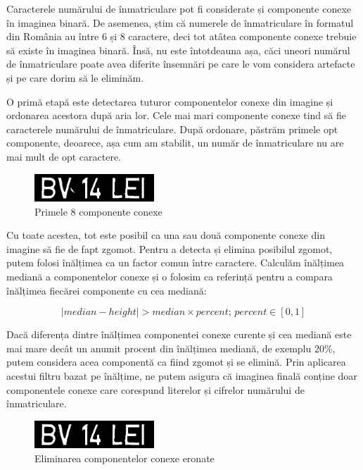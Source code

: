 \documentclass[a4paper,12pt]{report}
\begin{document}
Caracterele numărului de înmatriculare pot fi considerate și componente conexe în imaginea binară. De asemenea, știm că numerele de înmatriculare în formatul din România au între 6 și 8 caractere, deci tot atâtea componente conexe trebuie să existe în imaginea binară. Însă, nu este întotdeauna așa, căci uneori numărul de înmatriculare poate avea diferite însemnări pe care le vom considera artefacte și pe care dorim să le eliminăm.

O primă etapă este detectarea tuturor componentelor conexe din imagine și ordonarea acestora după aria lor. Cele mai mari componente conexe tind să fie caracterele numărului de înmatriculare. După ordonare, păstrăm primele opt componente, deoarece, așa cum am stabilit, un număr de înmatriculare nu are mai mult de opt caractere.

\begin{figure}[h]
    \centering
    \includegraphics[width=0.4\textwidth]{images/before_denoise.jpg}
    \caption{Primele 8 componente conexe}
\end{figure}
\FloatBarrier

Cu toate acestea, tot este posibil ca una sau două componente conexe din imagine să fie de fapt zgomot. Pentru a detecta și elimina posibilul zgomot, putem folosi înălțimea ca un factor comun între caractere. Calculăm înălțimea mediană a componentelor conexe și o folosim ca referință pentru a compara înălțimea fiecărei componente cu cea mediană:

\[
    \left| median - height \right| > median \times percent; \, percent \in [0, 1]
\]

Dacă diferența dintre înălțimea componentei conexe curente și cea mediană este mai mare decât un anumit procent din înălțimea mediană, de exemplu 20\%, putem considera acea componentă ca fiind zgomot și se elimină. Prin aplicarea acestui filtru bazat pe înălțime, ne putem asigura că imaginea finală conține doar componentele conexe care corespund literelor și cifrelor numărului de înmatriculare.

\begin{figure}[h]
    \centering
    \includegraphics[width=0.4\textwidth]{images/after_denoise.jpg}
    \caption{Eliminarea componentelor conexe eronate}
\end{figure}
\FloatBarrier
\end{document}

